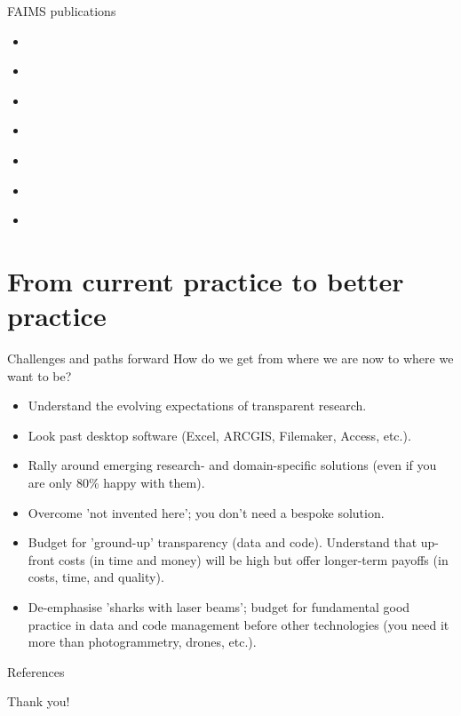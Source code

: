 \documentclass[aspectratio=169, 12pt]{beamer} %
\begin{document}
\begin{frame}{FAIMS publications}
      \begin{itemize}
        \item \cite{Sobotkova2018-al}
        \item \cite{Ballsun-Stanton2018-zd}
        \item \cite{VanValkenburgh2018-hv}
        \item \cite{sobotkova2016-mx}
        \item \cite{Ross2015-ph} 
        \item \cite{Sobotkova2015-lq}
        \item \cite{Ross2013-hi}
    \end{itemize}
\end{frame}

\section{From current practice to better practice}

\begin{frame}{Challenges and paths forward}
   How do we get from where we are now to where we want to be?
      \begin{itemize}
        \item Understand the evolving expectations of transparent research. 
        \item Look past desktop software (Excel, ARCGIS, Filemaker, Access, etc.).
        \item Rally around emerging research- and domain-specific solutions (even if you are only 80\% happy with them).
        \item Overcome 'not invented here'; you don't need a bespoke solution.
        \item Budget for 'ground-up' transparency (data and code). Understand that up-front costs (in time and money) will be high but offer longer-term payoffs (in costs, time, and quality).
        \item De-emphasise 'sharks with laser beams'; budget for fundamental good practice in data and code management before other technologies (you need it more than photogrammetry, drones, etc.).
    \end{itemize}
\end{frame}

\begin{frame}[allowframebreaks]{References}
  \tiny
  
  
\end{frame}


\begin{frame}[standout]
Thank you!
\end{frame}
\end{document}
